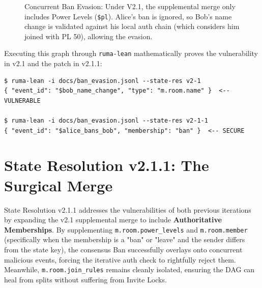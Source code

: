 \documentclass[12pt]{article}
\begin{document}
\begin{figure}[H]
\centering
{}
\caption{Concurrent Ban Evasion: Under V2.1, the supplemental merge only includes Power Levels (\texttt{\$pl}). Alice's ban is ignored, so Bob's name change is validated against his local auth chain (which considers him joined with PL 50), allowing the evasion.}
\label{fig:ban_evasion}
\end{figure}

Executing this graph through \texttt{ruma-lean} mathematically proves the vulnerability in v2.1 and the patch in v2.1.1:
\begin{lstlisting}[basicstyle=\ttfamily\footnotesize, frame=single, caption={ruma-lean Validation: Ban Evasion}]
$ ruma-lean -i docs/ban_evasion.jsonl --state-res v2-1
{ "event_id": "$bob_name_change", "type": "m.room.name" }  <-- VULNERABLE

$ ruma-lean -i docs/ban_evasion.jsonl --state-res v2-1-1
{ "event_id": "$alice_bans_bob", "membership": "ban" }  <-- SECURE
\end{lstlisting}

\section{State Resolution v2.1.1: The Surgical Merge}
State Resolution v2.1.1 addresses the vulnerabilities of both previous iterations by expanding the v2.1 supplemental merge to include \textbf{Authoritative Memberships}.
By supplementing \texttt{m.room.power\_levels} and \texttt{m.room.member} (specifically when the membership is a "ban" or "leave" and the sender differs from the state key), the consensus Ban successfully overlays onto concurrent malicious events, forcing the iterative auth check to rightfully reject them. Meanwhile, \texttt{m.room.join\_rules} remains cleanly isolated, ensuring the DAG can heal from splits without suffering from Invite Locks.
\end{document}
